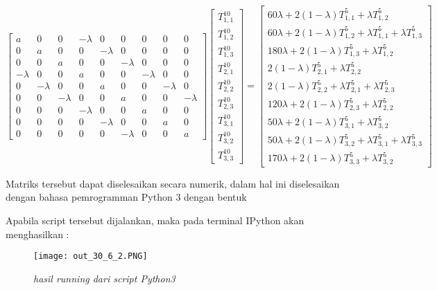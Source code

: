 \documentclass[a4paper,12pt]{article}
\numberwithin{equation}{section} %
\begin{document}
\begin{equation}
\begin{bmatrix}
a & 0 & 0 & -\lambda & 0 & 0 & 0 & 0 & 0\\ 
0 & a & 0 & 0 & -\lambda & 0 & 0 & 0 & 0\\ 
0 & 0 & a & 0 & 0 & -\lambda & 0 & 0 & 0\\ 
-\lambda & 0 & 0 & a & 0 & 0 & -\lambda & 0 & 0\\ 
0 & -\lambda & 0 & 0 & a & 0 & 0 & -\lambda & 0\\ 
0 & 0 & -\lambda & 0 & 0 & a & 0 & 0 & -\lambda\\ 
0 & 0 & 0 & -\lambda & 0 & 0 & a & 0 & 0\\ 
0 & 0 & 0 & 0 & -\lambda & 0 & 0 & a & 0\\ 
0 & 0 & 0 & 0 & 0 & -\lambda & 0 & 0 & a
\end{bmatrix}
\begin{bmatrix}
T_{1,1}^{10}\\ 
T_{1,2}^{10}\\ 
T_{1,3}^{10}\\ 
T_{2,1}^{10}\\ 
T_{2,2}^{10}\\ 
T_{2,3}^{10}\\ 
T_{3,1}^{10}\\ 
T_{3,2}^{10}\\ 
T_{3,3}^{10}
\end{bmatrix} = 
\begin{bmatrix}
60\lambda + 2(1-\lambda)T_{1,1}^5 + \lambda T_{1,2}^5\\ 
60\lambda + 2(1-\lambda)T_{1,2}^5 + \lambda T_{1,1}^5 + \lambda T_{1,3}^5\\ 
180\lambda + 2(1-\lambda)T_{1,3}^5 + \lambda T_{1,2}^5\\ 
2(1-\lambda)T_{2,1}^5 + \lambda T_{2,2}^5\\ 
2(1-\lambda)T_{2,2}^5 + \lambda T_{2,1}^5 + \lambda T_{2,3}^5\\ 
120 \lambda + 2(1-\lambda)T_{2,3}^5 + \lambda T_{2,2}^5\\ 
50\lambda + 2(1-\lambda)T_{3,1}^5 + \lambda T_{3,2}^5\\ 
50\lambda + 2(1-\lambda)T_{3,2}^5 + \lambda T_{3,1}^5 + \lambda T_{3,3}^5\\ 
170\lambda + 2(1-\lambda)T_{3,3}^5 + \lambda T_{3,2}^5
\end{bmatrix}
\end{equation}

Matriks tersebut dapat diselesaikan secara numerik, dalam hal ini diselesaikan dengan bahasa pemrogramman Python 3 dengan bentuk


Apabila script tersebut dijalankan, maka pada terminal IPython akan menghasilkan :
\begin{figure}[h]
	\centering
	\caption{\textit{hasil running dari script Python3}}
	\texttt{[image: out\_30\_6\_2.PNG]}
\end{figure}
\end{document}
